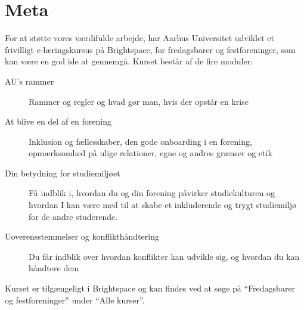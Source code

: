 \newpage
\section{Meta}
\label{sec:meta}

For at støtte vores værdifulde arbejde, har Aarhus Universitet 
udviklet et frivilligt e-læringskursus på Brightspace,
for fredagsbarer og festforeninger, som kan være en god ide at gennemgå.
Kurset består af de fire moduler:
\begin{description}
    \item[AU's rammer] Rammer og regler og hvad gør man, hvis der opstår en krise
    \item[At blive en del af en forening] Inklusion og fællesskaber, den gode 
    onboarding i en forening, opmærksomhed på ulige relationer, egne og andres grænser og etik
    \item[Din betydning for studiemiljøet] Få indblik i, hvordan du og din forening påvirker 
    studiekulturen og hvordan I kan være med til at skabe et inkluderende og 
    trygt studiemiljø for de andre studerende.
    \item [Uoverensstemmelser og konflikthåndtering] Du får indblik over hvordan konflikter 
    kan udvikle sig, og hvordan du kan håndtere dem
\end{description}
Kurset er tilgængeligt i Brightspace og kan findes ved at søge 
på ``Fredagsbarer og festforeninger'' under ``Alle kurser''.

\printindex


